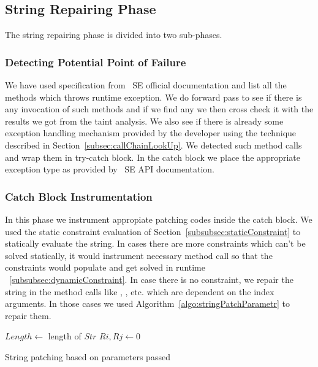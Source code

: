 \subsection{String Repairing Phase}
\label{subsec:stringReepairing}

The string repairing phase is divided into two sub-phases.

\subsubsection{Detecting Potential Point of Failure}
\label{subsub:detectingFailure}

We have used specification from \java\ SE official documentation and list all
the methods which throws runtime exception. We do forward pass to see if there 
is any invocation of such methods and if we find any we then cross check it 
with the results we got from the taint analysis. We also see if there is already
some exception handling mechanism provided by the developer using the technique 
described in Section~\ref{subsec:callChainLookUp}. We detected such method calls
and wrap them in try-catch block. In the catch block we place the appropriate
exception type as provided by \java\ SE API documentation. 

\subsubsection{Catch Block Instrumentation}
\label{subsub:catchInstrumentation}

In this phase we instrument appropiate patching codes inside the catch block.
We used the static constraint evaluation of
Section~\ref{subsubsec:staticConstraint} to statically evaluate the string. In
cases there are more constraints which can't be solved statically, it would instrument
necessary method call so that the constraints would populate and get solved in runtime
~\ref{subsubsec:dynamicConstraint}. In case there is no constraint, we repair the
string in the method calls like , ,  etc.
which are dependent on the index arguments. In those cases we used
Algorithm~\ref{algo:stringPatchParametr} to repair them.


\begin{algorithm}
\scriptsize
\DontPrintSemicolon
{}
\Begin
{
	$Length \longleftarrow$ length of $Str$\;
	 {
		$Ri, Rj \longleftarrow 0$\;
	} 	
}
\caption{String patching based on parameters passed}
\label{algo:stringPatchParametr}
\end{algorithm}

